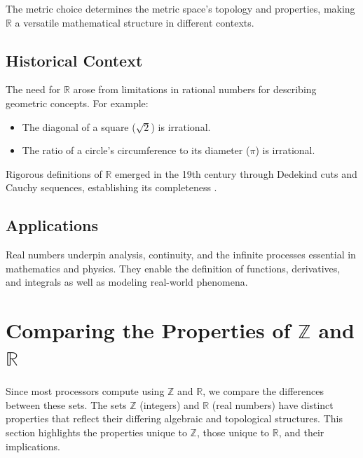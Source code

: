 The metric choice determines the metric space's topology and properties, making \( \mathbb{R} \) a versatile mathematical structure in different contexts.

\subsection{Historical Context}
The need for \( \mathbb{R} \) arose from limitations in rational numbers for describing geometric concepts. For example:

\begin{itemize}
    \item The diagonal of a square (\( \sqrt{2} \)) is irrational.
    \item The ratio of a circle's circumference to its diameter (\( \pi \)) is irrational.
\end{itemize}

Rigorous definitions of \( \mathbb{R} \) emerged in the 19th century through Dedekind cuts and Cauchy sequences, establishing its completeness \cite{rosen2018, stewart2015-foundations}.

\subsection{Applications}
Real numbers underpin analysis, continuity, and the infinite processes essential in mathematics and physics. They enable the definition of functions, derivatives, and integrals as well as modeling real-world phenomena.

\section{Comparing the Properties of \( \mathbb{Z} \) and \( \mathbb{R} \)}
Since most processors compute using $\mathbb{Z}$ and $\mathbb{R}$, we compare the differences between these sets.
The sets \( \mathbb{Z} \) (integers) and \( \mathbb{R} \) (real numbers) have distinct properties that reflect their differing algebraic and topological structures. This section highlights the properties unique to \( \mathbb{Z} \), those unique to \( \mathbb{R} \), and their implications.

